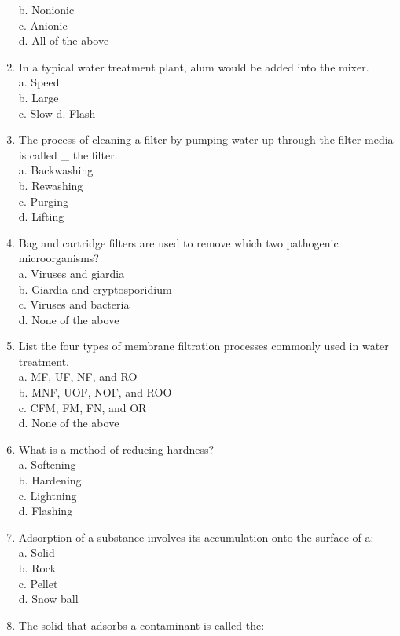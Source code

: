 \begin{enumerate}
b. Nonionic\\
c. Anionic\\
d. All of the above\\
\item In a typical water treatment plant, alum would be added into the mixer.\\
a. Speed\\
b. Large\\
c. Slow d. Flash\\
\item The process of cleaning a filter by pumping water up through the filter media is called \_ the filter.\\
a. Backwashing\\
b. Rewashing\\
c. Purging\\
d. Lifting\\
\item Bag and cartridge filters are used to remove which two pathogenic microorganisms?\\
a. Viruses and giardia\\
b. Giardia and cryptosporidium\\
c. Viruses and bacteria\\
d. None of the above\\
\item List the four types of membrane filtration processes commonly used in water treatment.\\
a. MF, UF, NF, and RO\\
b. MNF, UOF, NOF, and ROO\\
c. CFM, FM, FN, and OR\\
d. None of the above\\
\item What is a method of reducing hardness?\\
a. Softening\\
b. Hardening\\
c. Lightning\\
d. Flashing\\
\item Adsorption of a substance involves its accumulation onto the surface of a:\\
a. Solid\\
b. Rock\\
c. Pellet\\
d. Snow ball\\
\item The solid that adsorbs a contaminant is called the:\\

\end{enumerate}
